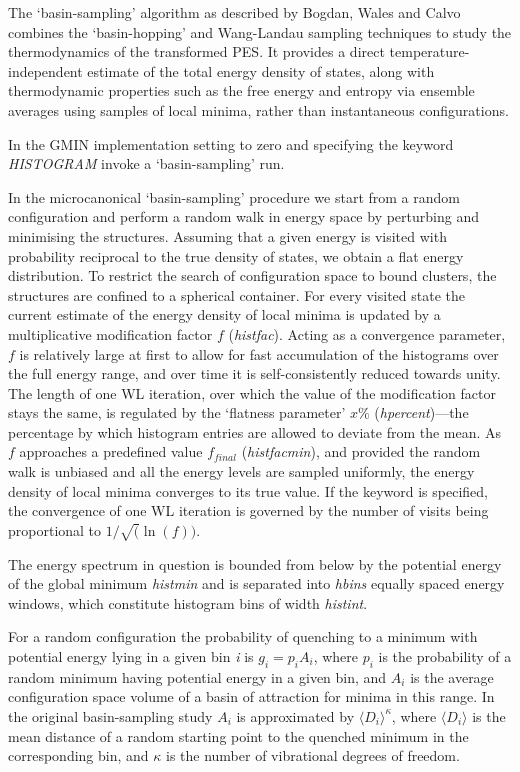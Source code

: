 The `basin-sampling' algorithm as described by Bogdan, Wales and Calvo \cite{BogdanWC06} 
combines the `basin-hopping' \cite{walesd97a} and Wang-Landau 
sampling techniques \cite{wangl01} to study the thermodynamics of the transformed PES.
It provides a direct temperature-independent estimate of the total energy density of states,
along with thermodynamic properties such as the free energy and entropy via ensemble averages using
samples of local minima, rather than instantaneous configurations.

In the GMIN implementation setting {}
to zero and specifying the keyword {\it HISTOGRAM} invoke a `basin-sampling' run. 

In the microcanonical `basin-sampling' 
procedure we start from a random configuration and perform a random walk in energy space
by perturbing and minimising the structures. Assuming that a given energy is visited with probability
reciprocal to the true density of states, 
we obtain a flat energy distribution. To restrict the search of configuration
space to  bound clusters, the structures are confined to a spherical container. 
For every visited state the current estimate of the energy density of local minima
is updated by a multiplicative modification factor $f$ ({\it histfac}). 
Acting as a convergence parameter, $f$ is relatively large at first to allow for
fast accumulation of the histograms over the full energy range, 
and over time it is self-consistently reduced towards unity.
The length of one WL iteration, over which the value of the
modification factor stays the same, is regulated by the 
`flatness parameter' $x \%$ ({\it hpercent})---the percentage by which histogram entries
are allowed to deviate from the mean. As $f$ approaches a predefined 
value $f_{final}$ ({\it histfacmin}), and provided the random walk is unbiased
and all the energy levels are sampled uniformly, the energy density of local
minima converges to its true value. If 
the {} keyword is specified, the convergence of one WL iteration is governed by
the number of visits being proportional to $1/\sqrt(\ln(f))$\cite{ZhouB03}.

The energy spectrum in question is bounded from below by the potential energy of the global 
minimum {\it histmin} and is separated into {\it hbins}  
equally spaced energy windows, which constitute histogram bins of width {\it histint}. 

For a random configuration the probability of quenching to a minimum with potential energy 
lying in a given bin {\it i}  is
$g_i=p_i A_i$, where $p_i$ is the probability of a random minimum having potential
energy in a given bin, and $A_i$ is the average configuration space volume
of a basin of attraction for minima in this range. In the original
basin-sampling study $A_i$ is approximated by 
$\langle D_i \rangle ^{\kappa} $, 
where $\langle D_i \rangle$ is  the mean distance of a random starting point to the quenched minimum in the
corresponding bin, and  $\kappa$ is the number of vibrational degrees of freedom. 

